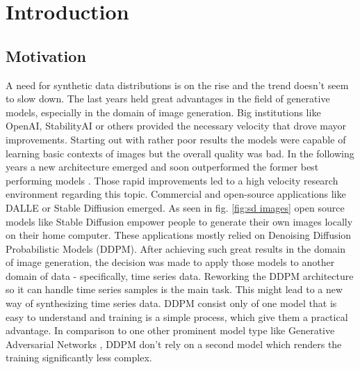 \chapter{Introduction}
\label{sec:introduction}
\section{Motivation}
\label{sec:motivation}
A need for synthetic data distributions is on the rise and the trend doesn't seem to slow down. 
The last years held great advantages in the field of generative models, especially in the domain of image generation.
Big institutions like OpenAI, StabilityAI or others provided the necessary velocity that drove mayor improvements. Starting out with rather
poor results the models were capable of learning basic contexts of images but the overall quality was bad. In the following years a new architecture
emerged \cite{ho_denoising_2020} \cite{nichol_improved_2021} and soon outperformed the former best performing models \cite{dhariwal_diffusion_2021}. 
Those rapid improvements led to a high velocity research environment regarding this topic. Commercial and open-source applications like DALLE or Stable Diffiusion emerged.
As seen in fig. \ref{fig:sd images} open source models like Stable Diffusion empower people to generate their own images locally on their home computer.
These applications mostly relied on Denoising Diffusion Probabilistic Models (DDPM). After achieving such great results in the domain of image generation, the decision was made to apply those models to another domain of data - specifically, time series data. Reworking the DDPM architecture so it can handle time series samples is the main task. This might lead
to a new way of synthesizing time series data. DDPM consist only of one model that is easy to understand and training is a simple process, which give them a practical advantage.
In comparison to one other prominent model type like Generative Adversarial Networks \cite{Goodfellow_2017}, DDPM don't rely on a second model which renders the training significantly less complex.
